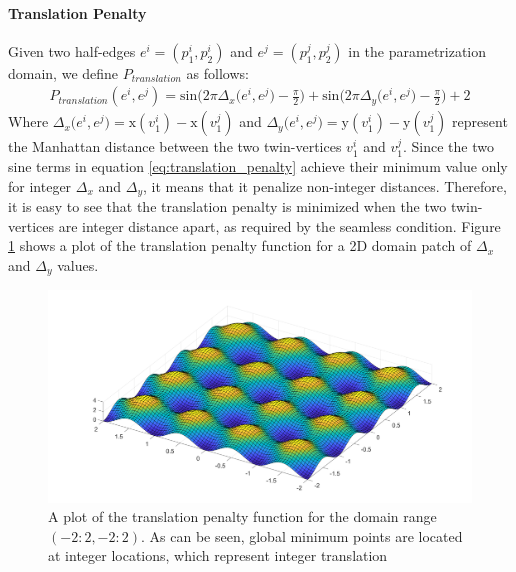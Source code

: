 \paragraph{Translation Penalty}
Given two half-edges $e^i = \left(p^i_1,p^i_2\right)$ and $e^j = \left(p^j_1,p^j_2\right)$ in the parametrization domain, we define $P_{translation}$ as follows:
\begin{equation}\label{eq:translation_penalty}
\begin{split}
P_{translation}\left(e^i,e^j\right) = \mathrm{sin} \Big( 2\pi\Delta_x\big(e^i,e^j\big) - \frac{\pi}{2}\Big) + \mathrm{sin} \Big( 2\pi\Delta_y\big(e^i,e^j\big) - \frac{\pi}{2}\Big) + 2
\end{split}
\end{equation}
Where $\Delta_x\big(e^i,e^j\big) = \mathrm{x}\left(v^i_1\right) - \mathrm{x}\left(v^j_1\right)$ and $\Delta_y\big(e^i,e^j\big) = \mathrm{y}\left(v^i_1\right) - \mathrm{y}\left(v^j_1\right)$ represent the Manhattan distance between the two twin-vertices $v^i_1$ and $v^j_1$. Since the two sine terms in equation \ref{eq:translation_penalty} achieve their minimum value only for integer $\Delta_x$ and $\Delta_y$, it means that it penalize non-integer distances. Therefore, it is easy to see that the translation penalty is minimized when the two twin-vertices are integer distance apart, as required by the seamless condition. Figure \ref{fig:translation_penalty} shows a plot of the translation penalty function for a 2D domain patch of $\Delta_x$ and $\Delta_y$ values. 
\begin{figure}[ht]
\centering
\includegraphics[width=15cm]{figures/seamless/translation_penalty.png}
\caption[Translation Penalty Function]{A plot of the translation penalty function for the domain range $\left(-2:2, -2:2\right)$. As can be seen, global minimum points are located at integer locations, which represent integer translation}
\label{fig:translation_penalty}
\end{figure}
